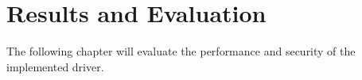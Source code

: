 \section{Results and Evaluation}
\label{chap_evaluation}
The following chapter will evaluate the performance and security of the implemented driver.

